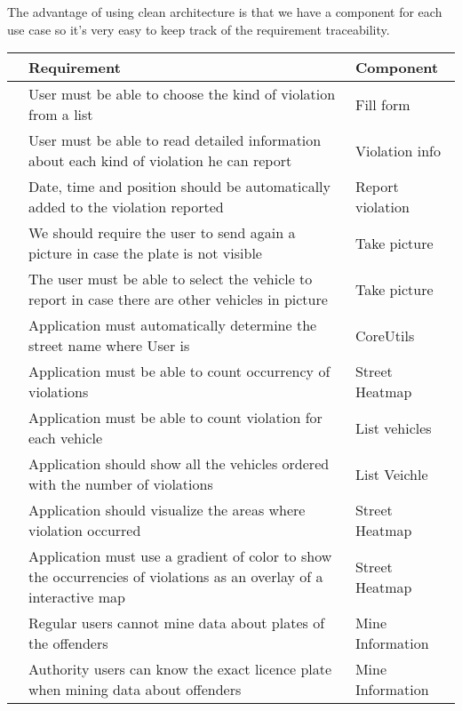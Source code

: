 The advantage of using clean architecture is that we have a component for each use case so it's very easy to keep track of the requirement traceability.

\begin{table}[H]
  \begin {centering}
\begin{tabular}{|l|p{10cm}|p{5cm}|}
\hline
 & \textbf{Requirement} & \textbf{Component} \\ \hline
[R1] & User must be able to choose the kind of violation from a list  &  Fill form \\ \hline  %
[R2] & User must be able to read detailed information about each kind of violation he can report  &  Violation info    \\ \hline %
[R3] & Date, time and position should be automatically added to the violation reported  & Report violation \\ \hline  %
[R4] & We should require the user to send again a picture in case the plate is not visible & Take picture \\ \hline %
[R5] & The user must be able to select the vehicle to report in case there are other vehicles in picture & Take picture \\ \hline %
[R6] & Application must automatically determine the street name where User is & CoreUtils \\ \hline  %
[R7] & Application must be able to count occurrency of violations  & Street Heatmap \\ \hline %
[R8] & Application must be able to count violation for each vehicle & List vehicles \\ \hline %
[R9] & Application should show all the vehicles ordered with the number of violations & List Veichle \\ \hline
[R10] & Application should visualize the areas where violation occurred & Street Heatmap\\ \hline %
[R11] & Application must use a gradient of color to show the occurrencies of violations as an overlay of a interactive map & Street Heatmap \\ \hline %
[R12] & Regular users cannot mine data about plates of the offenders & Mine Information \\ \hline %
[R13] & Authority users can know the exact licence plate when mining data about offenders & Mine Information \\ \hline %

\end{tabular}
\end{centering}
\end{table}

